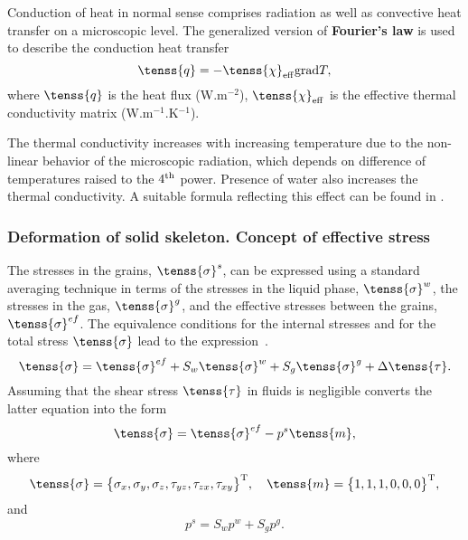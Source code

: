Conduction of heat in normal sense comprises radiation as well as convective heat transfer on a 
microscopic level. The generalized version of {\bf {Fourier's law}} is used to describe the conduction
 heat transfer
\begin{equation}\label{fourier}
\tenss{q} = - \tenss{\chi}_{\rm eff} {\rm grad} T,
\end{equation}
where $\tenss{q}$ is the heat flux (W.m$^{-2}$), $\tenss{\chi}_{\rm eff}$ is the effective thermal conductivity matrix 
(W.m$^{-1}$.K$^{-1}$).

The thermal conductivity increases with increasing temperature due to the non-linear 
behavior of the microscopic radiation, which depends on difference of temperatures raised to the 
$4^{\rm{th}}$ power. Presence of water also increases the thermal conductivity. A suitable formula
reflecting this effect can be found in \cite{lewis}.\\

\subsubsection{Deformation of solid skeleton. Concept of effective stress}

The stresses in the grains, $\tenss{\sigma}^s$, can be expressed using a standard averaging technique 
in terms of the stresses in the liquid phase, $\tenss{\sigma}^w$, the stresses in the gas, $\tenss{\sigma}^g$, 
and the effective stresses between the grains, $\tenss{\sigma}^{ef}$. The equivalence conditions for the internal 
stresses and for the total stress $\tenss{\sigma}$ lead to the expression~\cite{bitt}.
\begin{equation}\label{d3}
\tenss{\sigma} = \tenss{\sigma}^{ef} + S_w \tenss{\sigma}^w + S_g \tenss{\sigma}^g + \Delta \tenss{\tau}.
\end{equation}
Assuming that the shear stress $\tenss{\tau}$ in fluids is negligible converts the latter equation into the form
\begin{equation}\label{d4}
\tenss{\sigma} = \tenss{\sigma}^{ef} - p^s \tenss{m},
\end{equation}
where
\begin{equation}\label{d5}
\tenss{\sigma} = \big\{ \sigma_x,\sigma_y,\sigma_z,\tau_{yz},\tau_{zx},\tau_{xy}\big\}^{\rm T}, \quad
\tenss{m} = \big\{ 1,1,1,0,0,0 \big\}^{\rm T},
\end{equation}
and
\begin{equation}\label{d6}
p^s = S_w p^w + S_g p^g.
\end{equation}

